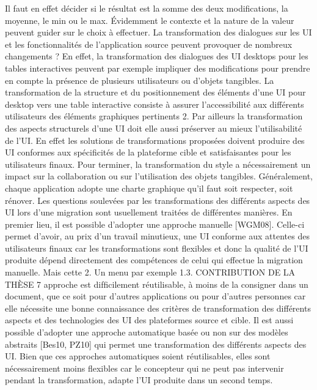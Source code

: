 \documentclass{article}
\begin{document}
Il faut en effet d\'{e}cider si le r\'{e}sultat est la somme des deux modiﬁcations, la moyenne, le min ou le
max. Évidemment le contexte et la nature de la valeur peuvent guider sur le choix \`{a} effectuer.
La transformation des dialogues sur les UI et les fonctionnalit\'{e}s de l’application source peuvent
provoquer de nombreux changements ? En effet, la transformation des dialogues des UI desktops
pour les tables interactives peuvent par exemple impliquer des modiﬁcations pour prendre en compte
la pr\'{e}sence de plusieurs utilisateurs ou d’objets tangibles.
La transformation de la structure et du positionnement des \'{e}l\'{e}ments d’une UI pour desktop vers
une table interactive consiste \`{a} assurer l’accessibilit\'{e} aux diff\'{e}rents utilisateurs des \'{e}l\'{e}ments graphiques pertinents 2. Par ailleurs la transformation des aspects structurels d’une UI doit elle aussi
pr\'{e}server au mieux l’utilisabilit\'{e} de l’UI. En effet les solutions de transformations propos\'{e}es doivent
produire des UI conformes aux sp\'{e}ciﬁcit\'{e}s de la plateforme cible et satisfaisantes pour les utilisateurs
ﬁnaux.
Pour terminer, la transformation du style a n\'{e}cessairement un impact sur la collaboration ou sur
l’utilisation des objets tangibles. G\'{e}n\'{e}ralement, chaque application adopte une charte graphique qu’il
faut soit respecter, soit r\'{e}nover.
Les questions soulev\'{e}es par les transformations des diff\'{e}rents aspects des UI lors d’une migration
sont usuellement trait\'{e}es de diff\'{e}rentes mani\`{e}res. En premier lieu, il est possible d’adopter une approche manuelle [WGM08]. Celle-ci permet d’avoir, au prix d’un travail minutieux, une UI conforme
aux attentes des utilisateurs ﬁnaux car les transformations sont ﬂexibles et donc la qualit\'{e} de l’UI
produite d\'{e}pend directement des comp\'{e}tences de celui qui effectue la migration manuelle. Mais cette
2. Un menu par exemple
1.3. CONTRIBUTION DE LA THÈSE
7
approche est difﬁcilement r\'{e}utilisable, \`{a} moins de la consigner dans un document, que ce soit pour
d’autres applications ou pour d’autres personnes car elle n\'{e}cessite une bonne connaissance des crit\`{e}res de transformation des diff\'{e}rents aspects et des technologies des UI des plateformes source et
cible.
Il est aussi possible d’adopter une approche automatique bas\'{e}e ou non sur des mod\`{e}les abstraits [Bes10, PZ10] qui permet une transformation des diff\'{e}rents aspects des UI. Bien que ces approches automatiques soient r\'{e}utilisables, elles sont n\'{e}cessairement moins ﬂexibles car le concepteur
qui ne peut pas intervenir pendant la transformation, adapte l’UI produite dans un second temps.
\end{document}
